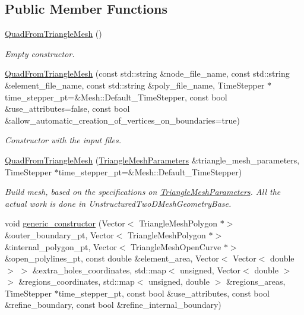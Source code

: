 \subsection*{Public Member Functions}
\begin{DoxyCompactItemize}
\item 
\hyperlink{classoomph_1_1QuadFromTriangleMesh_af94e552be1bd35ec03eed1bcfcbc40af}{Quad\+From\+Triangle\+Mesh} ()
\begin{DoxyCompactList}\small\item\em Empty constructor. \end{DoxyCompactList}\item 
\hyperlink{classoomph_1_1QuadFromTriangleMesh_ab6fd5b49a1c1a4b29fc000953b732b98}{Quad\+From\+Triangle\+Mesh} (const std\+::string \&node\+\_\+file\+\_\+name, const std\+::string \&element\+\_\+file\+\_\+name, const std\+::string \&poly\+\_\+file\+\_\+name, Time\+Stepper $\ast$time\+\_\+stepper\+\_\+pt=\&Mesh\+::\+Default\+\_\+\+Time\+Stepper, const bool \&use\+\_\+attributes=false, const bool \&allow\+\_\+automatic\+\_\+creation\+\_\+of\+\_\+vertices\+\_\+on\+\_\+boundaries=true)
\begin{DoxyCompactList}\small\item\em Constructor with the input files. \end{DoxyCompactList}\item 
\hyperlink{classoomph_1_1QuadFromTriangleMesh_a78f9c12882d4554e4484255640b6bf51}{Quad\+From\+Triangle\+Mesh} (\hyperlink{classoomph_1_1TriangleMeshParameters}{Triangle\+Mesh\+Parameters} \&triangle\+\_\+mesh\+\_\+parameters, Time\+Stepper $\ast$time\+\_\+stepper\+\_\+pt=\&Mesh\+::\+Default\+\_\+\+Time\+Stepper)
\begin{DoxyCompactList}\small\item\em Build mesh, based on the specifications on \hyperlink{classoomph_1_1TriangleMeshParameters}{Triangle\+Mesh\+Parameters}. All the actual work is done in Unstructured\+Two\+D\+Mesh\+Geometry\+Base. \end{DoxyCompactList}\item 
void \hyperlink{classoomph_1_1QuadFromTriangleMesh_ae2036525cc3a3b2bdd8edfa01783a303}{generic\+\_\+constructor} (Vector$<$ Triangle\+Mesh\+Polygon $\ast$$>$ \&outer\+\_\+boundary\+\_\+pt, Vector$<$ Triangle\+Mesh\+Polygon $\ast$$>$ \&internal\+\_\+polygon\+\_\+pt, Vector$<$ Triangle\+Mesh\+Open\+Curve $\ast$$>$ \&open\+\_\+polylines\+\_\+pt, const double \&element\+\_\+area, Vector$<$ Vector$<$ double $>$ $>$ \&extra\+\_\+holes\+\_\+coordinates, std\+::map$<$ unsigned, Vector$<$ double $>$ $>$ \&regions\+\_\+coordinates, std\+::map$<$ unsigned, double $>$ \&regions\+\_\+areas, Time\+Stepper $\ast$time\+\_\+stepper\+\_\+pt, const bool \&use\+\_\+attributes, const bool \&refine\+\_\+boundary, const bool \&refine\+\_\+internal\+\_\+boundary)
$$
\end{DoxyCompactItemize}
